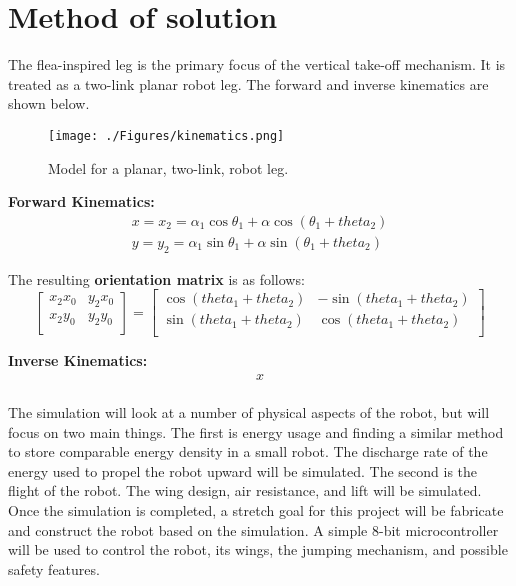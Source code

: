 \section{Method of solution}
\label{method}
\indent The flea-inspired leg is the primary focus of the vertical take-off mechanism. It is treated as a two-link planar robot leg. The forward and inverse kinematics are shown below.\\

\begin{figure}[H]
\begin{center}
\texttt{[image: ./Figures/kinematics.png]}
\caption{Model for a planar, two-link, robot leg.}
\label{fig:kinemaitcs}
\end{center}
\end{figure}

\textbf{Forward Kinematics:}
\begin{align}
	x = x_2 = \alpha_1\cos\theta_1 + \alpha\cos(\theta_1 + theta_2)\\
	y = y_2 = \alpha_1\sin\theta_1 + \alpha\sin(\theta_1 + theta_2)
\end{align}

\noindent The resulting \textbf{orientation matrix} is as follows:
\begin{equation}
	\begin{bmatrix}
		x_2x_0 & y_2x_0\\
		x_2y_0 & y_2y_0\\
	\end{bmatrix}
	= 
	\begin{bmatrix}
		\cos(theta_1 + theta_2) & -\sin(theta_1 + theta_2)\\
		\sin(theta_1 + theta_2) & \cos(theta_1 + theta_2)\\
	\end{bmatrix}
\end{equation}

\textbf{Inverse Kinematics:}
\begin{align}
	x\\
\end{align}

\indent The simulation will look at a number of physical aspects of the robot, but will focus on two main things. The first is energy usage and finding a similar method to store comparable energy density in a small robot. The discharge rate of the energy used to propel the robot upward will be simulated. The second is the flight of the robot. The wing design, air resistance, and lift will be simulated.\\

\indent Once the simulation is completed, a stretch goal for this project will be fabricate and construct the robot based on the simulation. A simple 8-bit microcontroller will be used to control the robot, its wings, the jumping mechanism, and possible safety features.\\

